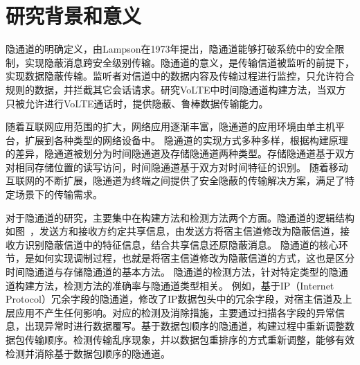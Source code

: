 \section{研究背景和意义}
\label{sec:intro:backgroud}



隐通道的明确定义，由Lampson在1973年提出，隐通道能够打破系统中的安全限制，实现隐蔽消息跨安全级别传输。隐通道的意义，是传输信道被监听的前提下，实现数据隐蔽传输。监听者对信道中的数据内容及传输过程进行监控，只允许符合规则的数据，并拦截其它会话请求。研究VoLTE中时间隐通道构建方法，当双方只被允许进行VoLTE通话时，提供隐蔽、鲁棒数据传输能力。

随着互联网应用范围的扩大，网络应用逐渐丰富，隐通道的应用环境由单主机平台，扩展到各种类型的网络设备中。
隐通道的实现方式多种多样，根据构建原理的差异，隐通道被划分为时间隐通道及存储隐通道两种类型。存储隐通道基于双方对相同存储位置的读写访问，时间隐通道基于双方对时间特征的识别。
随着移动互联网的不断扩展，隐通道为终端之间提供了安全隐蔽的传输解决方案，满足了特定场景下的传输需求。


对于隐通道的研究，主要集中在构建方法和检测方法两个方面。隐通道的逻辑结构如图\ ，发送方和接收方约定共享信息，由发送方将宿主信道修改为隐蔽信道，接收方识别隐蔽信道中的特征信息，结合共享信息还原隐蔽消息。
隐通道的核心环节，是如何实现调制过程，也就是将宿主信道修改为隐蔽信道的方式，这也是区分时间隐通道与存储隐通道的基本方法。
隐通道的检测方法，针对特定类型的隐通道构建方法，检测方法的准确率与隐通道类型相关。
例如，基于IP（Internet Protocol）冗余字段的隐通道，修改了IP数据包头中的冗余字段，对宿主信道及上层应用不产生任何影响。对应的检测及消除措施，主要通过扫描各字段的异常信息，出现异常时进行数据覆写。基于数据包顺序的隐通道，构建过程中重新调整数据包传输顺序。检测传输乱序现象，并以数据包重排序的方式重新调整，能够有效检测并消除基于数据包顺序的隐通道。

